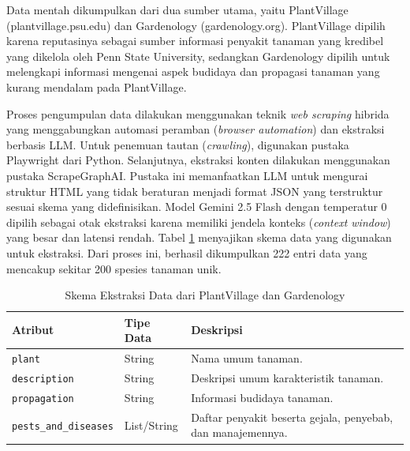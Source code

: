 Data mentah dikumpulkan dari dua sumber utama, yaitu PlantVillage (plantvillage.psu.edu) dan Gardenology (gardenology.org). PlantVillage dipilih karena reputasinya sebagai sumber informasi penyakit tanaman yang kredibel yang dikelola oleh Penn State University, sedangkan Gardenology dipilih untuk melengkapi informasi mengenai aspek budidaya dan propagasi tanaman yang kurang mendalam pada PlantVillage.

Proses pengumpulan data dilakukan menggunakan teknik \textit{web scraping} hibrida yang menggabungkan automasi peramban (\textit{browser automation}) dan ekstraksi berbasis LLM. Untuk penemuan tautan (\textit{crawling}), digunakan pustaka Playwright dari Python. Selanjutnya, ekstraksi konten dilakukan menggunakan pustaka ScrapeGraphAI. Pustaka ini memanfaatkan LLM untuk mengurai struktur HTML yang tidak beraturan menjadi format JSON yang terstruktur sesuai skema yang didefinisikan. Model Gemini 2.5 Flash dengan temperatur 0 dipilih sebagai otak ekstraksi karena memiliki jendela konteks (\textit{context window}) yang besar dan latensi rendah. Tabel \ref{tab:scraping_schema} menyajikan skema data yang digunakan untuk ekstraksi. Dari proses ini, berhasil dikumpulkan 222 entri data yang mencakup sekitar 200 spesies tanaman unik.

\begin{table}[H]
    \centering
    \caption{Skema Ekstraksi Data dari PlantVillage dan Gardenology}
    \label{tab:scraping_schema}
    \small
    \begin{tabular}{|l|l|p{7cm}|}
    \hline
    \textbf{Atribut} & \textbf{Tipe Data} & \textbf{Deskripsi} \\ \hline
    \texttt{plant} & String & Nama umum tanaman. \\ \hline
    \texttt{description} & String & Deskripsi umum karakteristik tanaman. \\ \hline
    \texttt{propagation} & String & Informasi budidaya tanaman. \\ \hline
    \texttt{pests\_and\_diseases} & List/String & Daftar penyakit beserta gejala, penyebab, dan manajemennya. \\ \hline
    \end{tabular}
\end{table}

